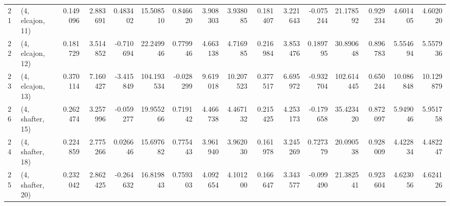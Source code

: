 \begin{tabular}{llrrrrrrrrrrrrrr}
21 &  (4, elcajon, 11) &   0.149096 &  2.883691 &  0.483402 &   15.508510 &  0.846620 &   3.908303 &   3.938085 &  0.181407 &   3.221643 & -0.075244 &   21.178592 &  0.929234 &   4.601405 &   4.602020 \\
22 &  (4, elcajon, 12) &   0.181729 &  3.514852 & -0.710694 &   22.249946 &  0.779946 &   4.663138 &   4.716985 &  0.216984 &   3.853476 &  0.189795 &   30.890648 &  0.896783 &   5.554694 &   5.557936 \\
23 &  (4, elcajon, 13) &   0.370114 &  7.160427 & -3.415849 &  104.193534 & -0.028299 &   9.619018 &  10.207523 &  0.377517 &   6.695972 & -0.932704 &  102.614445 &  0.650244 &  10.086848 &  10.129879 \\
26 &  (4, shafter, 15) &   0.262474 &  3.257996 & -0.059277 &   19.955266 &  0.719142 &   4.466738 &   4.467132 &  0.215425 &   4.253173 & -0.179658 &   35.423420 &  0.872097 &   5.949046 &   5.951758 \\
24 &  (4, shafter, 18) &   0.224859 &  2.775266 &  0.026646 &   15.697682 &  0.775443 &   3.961940 &   3.962030 &  0.161978 &   3.245269 &  0.727379 &   20.090538 &  0.928009 &   4.422834 &   4.482247 \\
25 &  (4, shafter, 20) &   0.232042 &  2.862425 & -0.264632 &   16.819843 &  0.759303 &   4.092654 &   4.101200 &  0.166647 &   3.343577 & -0.099490 &   21.382541 &  0.923604 &   4.623056 &   4.624126 \\
\bottomrule
\end{tabular}
